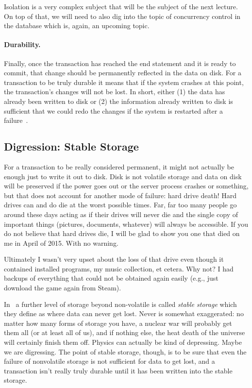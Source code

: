 \documentclass[a4paper]{report}
\begin{document}
Isolation is a very complex subject that will be the subject of the next lecture. On top of that, we will need to also dig into the topic of concurrency control in the database which is, again, an upcoming topic. 

\paragraph{Durability.} Finally, once the transaction has reached the end statement and it is ready to commit, that change should be permanently reflected in the data on disk. For a transaction to be truly durable it means that if the system crashes at this point, the transaction's changes will not be lost. In short, either (1) the data has already been written to disk or (2) the information already written to disk is sufficient that we could redo the changes if the system is restarted after a failure~\cite{dsc}.

\subsection*{Digression: Stable Storage}

For a transaction to be really considered permanent, it might not actually be enough just to write it out to disk. Disk is not volatile storage and data on disk will be preserved if the power goes out or the server process crashes or something, but that does not account for another mode of failure: hard drive death! Hard drives can and do die at the worst possible times. Far, far too many people go around these days acting as if their drives will never die and the single copy of important things (pictures, documents, whatever) will always be accessible. If you do not believe that hard drives die, I will be glad to show you one that died on me in April of 2015. With no warning.

Ultimately I wasn't very upset about the loss of that drive even though it contained installed programs, my music collection, et cetera. Why not? I had backups of everything that could not be obtained again easily (e.g., just download the game again from Steam).  

In~\cite{dsc} a further level of storage beyond non-volatile is called \textit{stable storage} which they define as where data can never get lost. Never is somewhat exaggerated: no matter how many forms of storage you have, a nuclear war will probably get them all (or at least all of us), and if nothing else, the heat death of the universe will certainly finish them off. Physics can actually be kind of depressing. Maybe we are digressing. The point of stable storage, though, is to be sure that even the failure of nonvolatile storage is not sufficient for data to get lost, and a transaction isn't really truly durable until it has been written into the stable storage.
\end{document}

